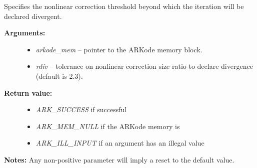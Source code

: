 \documentclass[letterpaper,10pt,english]{sphinxmanual}
\begin{document}
\begin{fulllineitems}
\label{c_interface/User_callable:c.ARKodeSetNonlinRDiv}
Specifies the nonlinear correction threshold beyond which the
iteration will be declared divergent.
\begin{description}
\item[{\textbf{Arguments:}}] \leavevmode\begin{itemize}
\item {} 
\emph{arkode\_mem} -- pointer to the ARKode memory block.

\item {} 
\emph{rdiv} -- tolerance on nonlinear correction size ratio to
declare divergence (default is 2.3).

\end{itemize}

\item[{\textbf{Return value:}}] \leavevmode\begin{itemize}
\item {} 
\emph{ARK\_SUCCESS} if successful

\item {} 
\emph{ARK\_MEM\_NULL} if the ARKode memory is 

\item {} 
\emph{ARK\_ILL\_INPUT} if an argument has an illegal value

\end{itemize}

\end{description}

\textbf{Notes:} Any non-positive parameter will imply a reset to the default value.

\end{fulllineitems}

\end{document}
